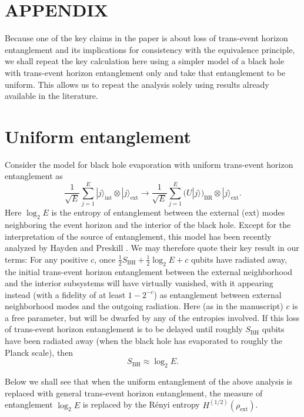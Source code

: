 \documentclass[twocolumn,aps,prl]{revtex4}
\begin{document}
\section*{APPENDIX}

Because one of the key claims in the paper is about loss of trans-event
horizon entanglement and its implications for consistency with the
equivalence principle, we shall repeat the key calculation here
using a simpler model of a black hole with trans-event horizon
entanglement only and take that entanglement to be uniform. This
allows us to repeat the analysis solely using results already available in
the literature.
\section{Uniform entanglement}

Consider the model for black hole evaporation with uniform trans-event
horizon entanglement as
\begin{equation}
\frac{1}{\sqrt{E}}\sum_{j=1}^{E}
|j\rangle_{\text{int}}\otimes|j\rangle_{\text{ext}}\rightarrow
\frac{1}{\sqrt{E}}\sum_{j=1}^{E}
(U|j\rangle)_{\text{BR}} \otimes|j\rangle_{\text{ext}}.
\end{equation}
Here $\log_2 E$ is the entropy of entanglement between the external (ext)
modes neighboring the event horizon and the interior of the black
hole. Except for the interpretation of the source of entanglement,
this model has been recently analyzed by Hayden and Preskill
\cite{Hayden07}.
We may therefore quote their key result in our terms: For any
positive $c$, once $\frac{1}{2} S_{\text{BH}}+\frac{1}{2} \log_2 E + c$
qubits have radiated away, the initial trans-event horizon entanglement
between the external neighborhood and the interior subsystems will
have virtually vanished, with it appearing instead (with a fidelity of
at least $1-2^{-c}$) as entanglement between external neighborhood
modes and the outgoing radiation. Here (as in the manuscript) $c$
is a free parameter, but will be dwarfed by any of the entropies
involved. If this loss of trans-event horizon entanglement is to be
delayed until roughly $S_{\text{BH}}$ qubits have been radiated away
(when the black hole has evaporated to roughly the Planck scale), then 
\begin{equation}
S_{\text{BH}}\approx \log_2 E.
\end{equation}

Below we shall see that when the uniform entanglement of the above analysis
is replaced with general trans-event horizon entanglement, the measure
of entanglement $\log_2 E$ is replaced by the R\'enyi entropy
$H^{(1/2)}(\rho_{\text{ext}})$.
\end{document}
